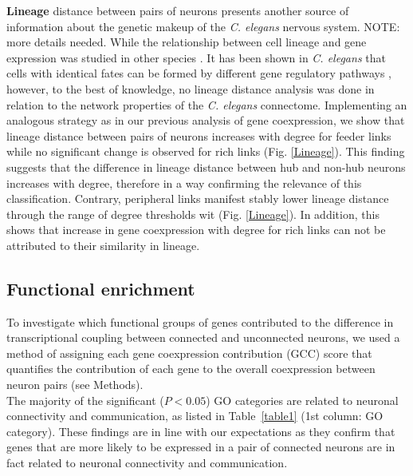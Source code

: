 \documentclass[10pt,letterpaper]{article}
\begin{document}
\textbf{Lineage} distance between pairs of neurons presents another source of information about the genetic makeup of the \textit{C. elegans} nervous system.
NOTE: more details needed. While the relationship between cell lineage and gene expression was studied in other species \citep{Cui2007, Kluger2004}.
It has been shown in \textit{C. elegans} that cells with identical fates can be formed by different gene regulatory pathways \citep{Liu2009}, however, to the best of knowledge, no lineage distance analysis was done in relation to the network properties of the \textit{C. elegans} connectome.
Implementing an analogous strategy as in our previous analysis of gene coexpression, we show that lineage distance between pairs of neurons increases with degree for feeder links while no significant change is observed for rich links (Fig. \ref{Lineage}).
This finding suggests that the difference in lineage distance between hub and non-hub neurons increases with degree, therefore in a way confirming the relevance of this classification.
Contrary, peripheral links manifest stably lower lineage distance through the range of degree thresholds wit (Fig. \ref{Lineage}).
In addition, this shows that increase in gene coexpression with degree for rich links can not be attributed to their similarity in lineage.


\subsection*{Functional enrichment}


To investigate which functional groups of genes contributed to the difference in transcriptional coupling between connected and unconnected neurons, we used a method of assigning each gene coexpression contribution (GCC) score that quantifies the contribution of each gene to the overall coexpression between neuron pairs (see Methods).  \\

The majority of the significant ($P < 0.05$) GO categories are related to neuronal connectivity and communication, as listed in Table~\ref{table1} (1st column: GO category).
These findings are in line with our expectations as they confirm that genes that are more likely to be expressed in a pair of connected neurons are in fact related to neuronal connectivity and communication.\\
\end{document}
